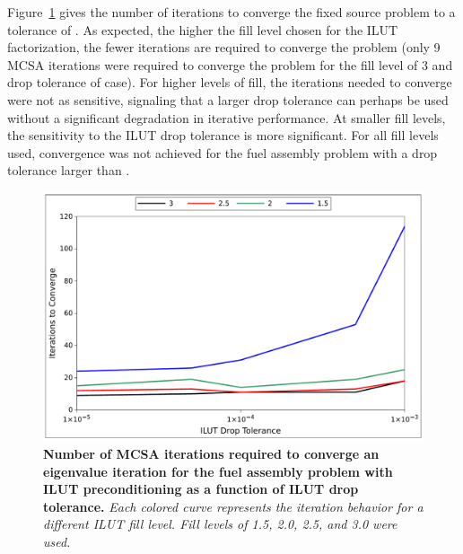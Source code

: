Figure~\ref{fig:ilut_iterations} gives the number of iterations to
converge the fixed source problem to a tolerance of . As
expected, the higher the fill level chosen for the ILUT factorization,
the fewer iterations are required to converge the problem (only 9 MCSA
iterations were required to converge the problem for the fill level of
3 and drop tolerance of  case). For higher levels of fill,
the iterations needed to converge were not as sensitive, signaling
that a larger drop tolerance can perhaps be used without a significant
degradation in iterative performance. At smaller fill levels, the
sensitivity to the ILUT drop tolerance is more significant. For all
fill levels used, convergence was not achieved for the fuel assembly
problem with a drop tolerance larger than .
\begin{figure}[t!]
  \begin{center}
    \includegraphics[width=6in]{chapters/spn_equations/ilut_iterations.pdf}
  \end{center}
  \caption{\textbf{Number of MCSA iterations required to converge an
      eigenvalue iteration for the fuel assembly problem with ILUT
      preconditioning as a function of ILUT drop tolerance.}
    \textit{Each colored curve represents the iteration behavior for a
      different ILUT fill level. Fill levels of 1.5, 2.0, 2.5, and 3.0
      were used.}}
  \label{fig:ilut_iterations}
\end{figure}

